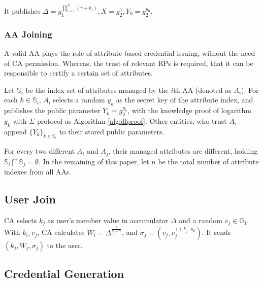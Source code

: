 \documentclass[journal]{IEEEtran}
\begin{document}
	It publishes $\Delta = g_1^{\prod_{i=1}^{N}(\gamma+k_i)}, X= g_2^\gamma, Y_0= g_2^{y_0}$.
	\subsubsection{AA Joining}
	A valid AA plays the role of attribute-based credential issuing, without the need of CA permission. Whereas, the trust of relevant RPs is required, that it can be responsible to certify a certain set of attributes.
	
	Let $\mathbb{S}_i$ be the index set of attributes managed by the $i$th AA (denoted as $A_i$). For each $k\in \mathbb{S}_i$, $A_i$ selects a random $y_k$ as the secret key of the attribute index, and publishes the public parameter $Y_k = g_2^{y_k}$, with the knowledge proof of logarithm $y_k$ with $\Sigma$ protocol as Algorithm \ref{alg:dlproof}. 
	Other entities, who trust $A_i$ append $\{Y_k\}_{k\in \mathbb{S}_i}$ to their stored public parameters.
	
	For every two different $A_i$ and $A_j$, their managed attributes are different, holding $\mathbb{S}_i \bigcap \mathbb{S}_j = \emptyset$. In the remaining of this paper, let $n$ be the total number of attribute indexes from all AAs.
	\subsection{User Join}
	CA selects $k_j$ as user's member value in accumulator $\Delta$ and a random $v_j \in \mathbb{G}_1$. With $k_i, v_j$, CA calculates $W_i = \Delta^{\frac{1}{k_j + \gamma}}$, and $\sigma_j = (v_j, v_j^{\gamma+ k_j\cdot y_0})$. It sends $(k_j, W_j, \sigma_j)$ to the user. 
	
	\subsection{Credential Generation}
	
\end{document}
